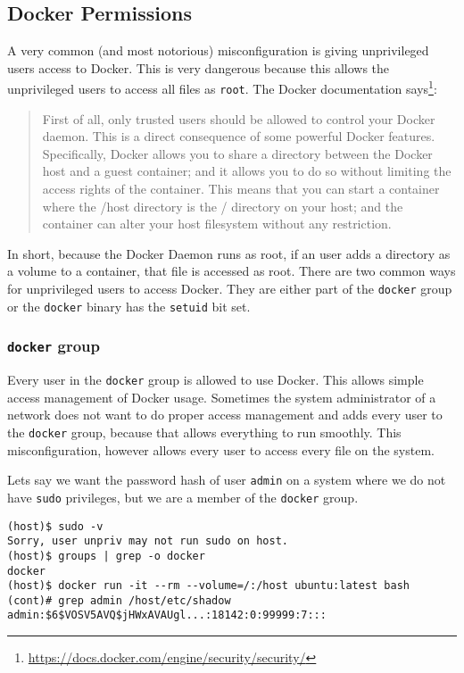 \subsection{Docker Permissions}\label{subsection:docker-permissions}
A very common (and most notorious) misconfiguration is giving unprivileged users access to Docker. This is very dangerous because this allows the unprivileged users to access all files as \lstinline{root}. The Docker documentation says\footnote{\url{https://docs.docker.com/engine/security/security/}}:
\begin{quote}
First of all, only trusted users should be allowed to control your Docker daemon. This is a direct consequence of some powerful Docker features. Specifically, Docker allows you to share a directory between the Docker host and a guest container; and it allows you to do so without limiting the access rights of the container. This means that you can start a container where the /host directory is the / directory on your host; and the container can alter your host filesystem without any restriction.
\end{quote}

In short, because the Docker Daemon runs as root, if an user adds a directory as a volume to a container, that file is accessed as root. There are two common ways for unprivileged users to access Docker. They are either part of the \lstinline{docker} group or the \lstinline{docker} binary has the \lstinline{setuid} bit set.

\subsubsection{\texorpdfstring{\lstinline{docker}}{docker} group}
Every user in the \lstinline{docker} group is allowed to use Docker. This allows simple access management of Docker usage. Sometimes the system administrator of a network does not want to do proper access management and adds every user to the \lstinline{docker} group, because that allows everything to run smoothly. This misconfiguration, however allows every user to access every file on the system.

\hfill

Lets say we want the password hash of user \lstinline{admin} on a system where we do not have \lstinline{sudo} privileges, but we are a member of the \lstinline{docker} group.

\begin{lstlisting}[caption={Docker \lstinline{group} exploit example},captionpos=b]
(host)$ sudo -v
Sorry, user unpriv may not run sudo on host.
(host)$ groups | grep -o docker
docker
(host)$ docker run -it --rm --volume=/:/host ubuntu:latest bash
(cont)# grep admin /host/etc/shadow
admin:$6$VOSV5AVQ$jHWxAVAUgl...:18142:0:99999:7:::
\end{lstlisting}

